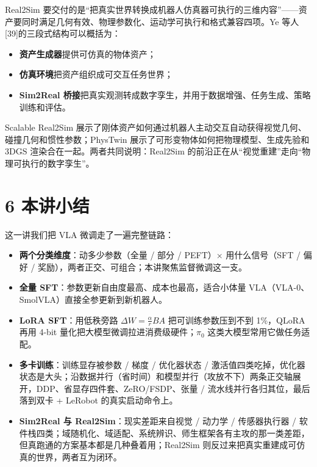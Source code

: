 \documentclass[
  chinese,
]{ctexart}
\providecommand{\tightlist}{%
  \setlength{\itemsep}{0pt}\setlength{\parskip}{0pt}}
\begin{document}
Real2Sim
要交付的是``把真实世界转换成机器人仿真器可执行的三维内容''------资产要同时满足几何有效、物理参数化、运动学可执行和格式兼容四项。Ye
等人{[}39{]}的三段式结构可以概括为：

\begin{itemize}
\tightlist
\item
  \textbf{资产生成器}提供可仿真的物体资产；
\item
  \textbf{仿真环境}把资产组织成可交互任务世界；
\item
  \textbf{Sim2Real
  桥接}把真实观测转成数字孪生，并用于数据增强、任务生成、策略训练和评估。
\end{itemize}

Scalable Real2Sim
展示了刚体资产如何通过机器人主动交互自动获得视觉几何、碰撞几何和惯性参数；PhysTwin
展示了可形变物体如何把物理模型、生成先验和 3DGS
渲染合在一起。两者共同说明：Real2Sim
的前沿正在从``视觉重建''走向``物理可执行的数字孪生''。

\section{6 本讲小结}\label{ux672cux8bb2ux5c0fux7ed3}

这一讲我们把 VLA 微调走了一遍完整链路：

\begin{itemize}
\tightlist
\item
  \textbf{两个分类维度}：动多少参数（全量 / 部分 / PEFT）×
  用什么信号（SFT / 偏好 /
  奖励），两者正交、可组合；本讲聚焦监督微调这一支。
\item
  \textbf{全量 SFT}：参数更新自由度最高、成本也最高，适合小体量
  VLA（VLA-0、SmolVLA）直接全参更新到新机器人。
\item
  \textbf{LoRA SFT}：用低秩旁路 \(\Delta W=\frac{\alpha}{r}BA\)
  把可训练参数压到不到 1\%，QLoRA 再用 4-bit
  量化把大模型微调拉进消费级硬件；\(\pi_0\) 这类大模型常用它做任务适配。
\item
  \textbf{多卡训练}：训练显存被参数 / 梯度 / 优化器状态 /
  激活值四类吃掉，优化器状态是大头；沿数据并行（省时间）和模型并行（攻放不下）两条正交轴展开，DDP、省显存四件套、ZeRO/FSDP、张量
  / 流水线并行各归其位，最后落到双卡 + LeRobot 的真实启动命令上。
\item
  \textbf{Sim2Real 与 Real2Sim}：现实差距来自视觉 / 动力学 /
  传感器执行器 /
  软件栈四类；域随机化、域适配、系统辨识、师生框架各有主攻的那一类差距，但真跑通的方案基本都是几种叠着用；Real2Sim
  则反过来把真实重建成可仿真的世界，两者互为闭环。
\end{itemize}
\end{document}

